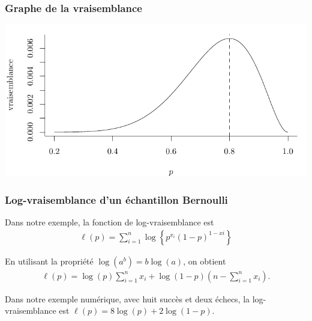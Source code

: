 \documentclass{beamer}
\begin{document}
 \begin{frame}
\frametitle{Graphe de la vraisemblance}
\begin{center}
\includegraphics[width = \linewidth]{img/c3/likelihood_fr.pdf}
\end{center}

\end{frame}
% 
% 

\begin{frame}
\frametitle{Log-vraisemblance d'un échantillon Bernoulli}
\bi
\item Dans notre exemple, la fonction de log-vraisemblance est
\begin{align*}
\ell(p)=\sum_{i=1}^n \log\left\{p^{x_i}(1-p)^{1-xi}\right\}
\end{align*}
\item En utilisant la propriété $\log(a^b)=b\log(a)$, on obtient
\begin{align*}
\ell(p)=\log(p)\sum_{i=1}^n x_i + \log(1-p) \left(n-\sum_{i=1}^n x_i\right).
\end{align*}
\item Dans notre exemple numérique, avec huit succès et deux échecs, la log-vraisemblance est $\ell(p)=8 \log(p) + 2 \log(1-p)$.

\ei
\end{frame}
\end{document}
